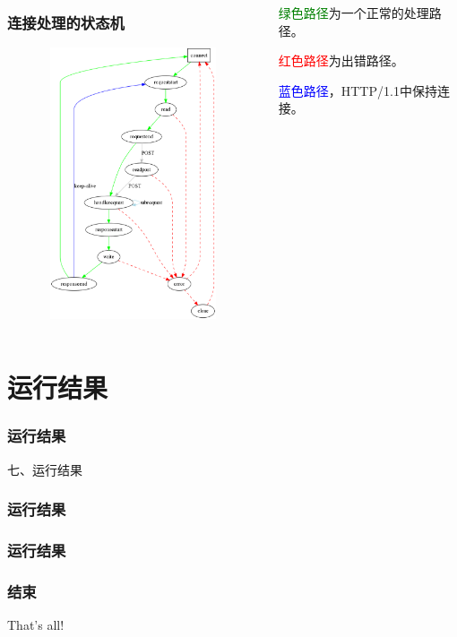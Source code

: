 \documentclass[10pt,dvipdfm]{beamer}
\begin{document}
\begin{frame}
	\begin{columns}
	
	\begin{column}{0.6\textwidth}
		\frametitle{连接处理的状态机}
		\begin{figure}[htbp]
		\centering
		\includegraphics[height=8cm, width=6cm]{state.eps}
		\end{figure}
	\end{column}
	
	\begin{column}{0.3\textwidth}
		\begin{block}{}
			\textcolor{green}{绿色路径}为一个正常的处理路径。\\
		\end{block}
		\begin{block}{}
			\textcolor{red}{红色路径}为出错路径。\\
		\end{block}
		\begin{block}{}	
			\textcolor{blue}{蓝色路径}，HTTP/1.1中保持连接。
		\end{block}
	\end{column}
	
	\end{columns}
	
\end{frame}

\section{运行结果}

\begin{frame}
	\frametitle{运行结果}
	\begin{center}
	{\Large
		七、运行结果
	}
	\end{center}
\end{frame}

\begin{frame}
	\frametitle{运行结果}
\end{frame}

\begin{frame}
	\frametitle{运行结果}
\end{frame}

\begin{frame}
	\frametitle{结束}
	\begin{center}
	{\Huge
		That's all!
	}
	\end{center}
\end{frame}
\end{document}
